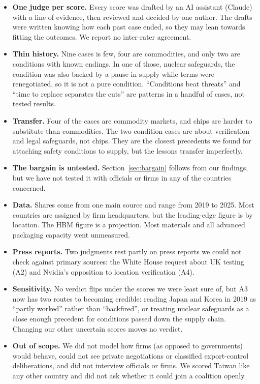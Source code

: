 \documentclass[11pt]{article}
\begin{document}
\begin{itemize}[leftmargin=*]
\item \textbf{One judge per score.} Every score was drafted by an AI assistant (Claude) with a line of evidence, then reviewed and decided by one author. The drafts were written knowing how each past case ended, so they may lean towards fitting the outcomes. We report no inter-rater agreement.
\item \textbf{Thin history.} Nine cases is few, four are commodities, and only two are conditions with known endings. In one of those, nuclear safeguards, the condition was also backed by a pause in supply while terms were renegotiated, so it is not a pure condition. ``Conditions beat threats'' and ``time to replace separates the cuts'' are patterns in a handful of cases, not tested results.
\item \textbf{Transfer.} Four of the cases are commodity markets, and chips are harder to substitute than commodities. The two condition cases are about verification and legal safeguards, not chips. They are the closest precedents we found for attaching safety conditions to supply, but the lessons transfer imperfectly.
\item \textbf{The bargain is untested.} Section~\ref{sec:bargain} follows from our findings, but we have not tested it with officials or firms in any of the countries concerned.
\item \textbf{Data.} Shares come from one main source and range from 2019 to 2025. Most countries are assigned by firm headquarters, but the leading-edge figure is by location. The HBM figure is a projection. Most materials and all advanced packaging capacity went unmeasured.
\item \textbf{Press reports.} Two judgments rest partly on press reports we could not check against primary sources: the White House request about UK testing (A2) and Nvidia's opposition to location verification (A4).
\item \textbf{Sensitivity.} No verdict flips under the scores we were least sure of, but A3 now has two routes to becoming credible: reading Japan and Korea in 2019 as ``partly worked'' rather than ``backfired'', or treating nuclear safeguards as a close enough precedent for conditions passed down the supply chain. Changing our other uncertain scores moves no verdict.
\item \textbf{Out of scope.} We did not model how firms (as opposed to governments) would behave, could not see private negotiations or classified export-control deliberations, and did not interview officials or firms. We scored Taiwan like any other country and did not ask whether it could join a coalition openly.
\end{itemize}
\end{document}
